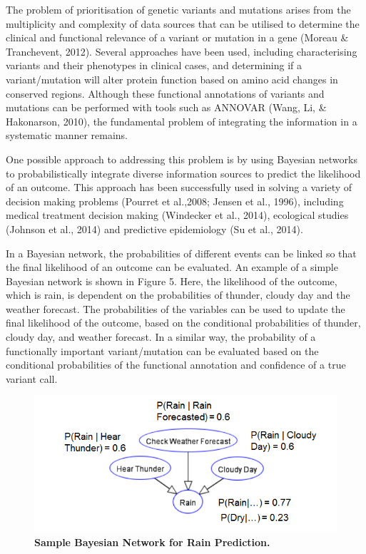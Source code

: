 \documentclass{article}
\begin{document}
 The problem of prioritisation of genetic variants and mutations arises from the multiplicity and complexity of data sources that can be utilised to determine the clinical and functional relevance of a variant or mutation in a gene (Moreau \& Tranchevent, 2012). Several approaches have been used, including characterising variants and their phenotypes in clinical cases, and determining if a variant/mutation will alter protein function based on amino acid changes in conserved regions. Although these functional annotations of variants and mutations can be performed with tools such as ANNOVAR (Wang, Li, \& Hakonarson, 2010), the fundamental problem of integrating the information in a systematic manner remains. 
 
 One possible approach to addressing this problem is by using Bayesian networks to probabilistically integrate diverse information sources to predict the likelihood of an outcome. This approach has been successfully used in solving a variety of decision making problems (Pourret et al.,2008; Jensen et al., 1996), including medical treatment decision making (Windecker et al., 2014), ecological studies (Johnson et al., 2014) and predictive epidemiology (Su et al., 2014).
 
 In a Bayesian network, the probabilities of different events can be linked so that the final likelihood of an outcome can be evaluated. An example of a simple Bayesian network is shown in Figure 5. Here, the likelihood of the outcome, which is rain, is dependent on the probabilities of thunder, cloudy day and the weather forecast. The probabilities of the variables can be used to update the final likelihood of the outcome, based on the conditional probabilities of thunder, cloudy day, and weather forecast. In a similar way, the probability of a functionally important variant/mutation can be evaluated based on the conditional probabilities of the functional annotation and confidence of a true variant call.
 
\begin{figure}[H]
\centering
\includegraphics{samplebayesiannetwork.png}
\caption{\textbf{Sample Bayesian Network for Rain Prediction.}}
\end{figure}
\end{document}
